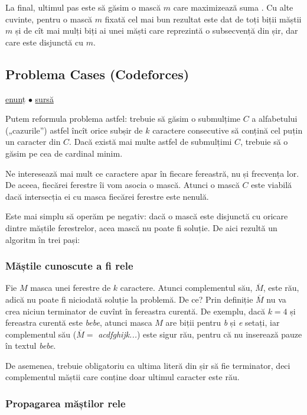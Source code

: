 \documentclass[../main.tex]{subfiles}
\begin{document}
La final, ultimul pas este să găsim o mască $m$ care maximizează suma . Cu alte cuvinte, pentru o mască $m$ fixată cel mai bun rezultat este dat de toți biții măștii $m$ și de cît mai mulți biți ai unei măști care reprezintă o subsecvență din șir, dar care este disjunctă cu $m$.


\subsection{Problema Cases (Codeforces)}
\label{problem:cases}

\href{https://codeforces.com/contest/1995/problem/D}{enunț}
$\bullet$
\hyperref[code:cases]{sursă}

Putem reformula problema astfel: trebuie să găsim o submulțime $C$ a alfabetului („cazurile”) astfel încît orice subșir de $k$ caractere consecutive să conțină cel puțin un caracter din $C$. Dacă există mai multe astfel de submulțimi $C$, trebuie să o găsim pe cea de cardinal minim.

Ne interesează mai mult ce caractere apar în fiecare fereastră, nu și frecvența lor. De aceea, fiecărei ferestre îi vom asocia o mască. Atunci o mască $C$ este viabilă dacă intersecția ei cu masca fiecărei ferestre este nenulă.

Este mai simplu să operăm pe negativ: dacă o mască este disjunctă cu oricare dintre măștile ferestrelor, acea mască nu poate fi soluție. De aici  rezultă un algoritm în trei pași:

\subsubsection*{Măștile cunoscute a fi rele}

Fie $M$ masca unei ferestre de $k$ caractere. Atunci complementul său, $\overline{M}$, este rău, adică nu poate fi niciodată soluție la problemă. De ce? Prin definiție $\overline{M}$ nu va crea niciun terminator de cuvînt în fereastra curentă. De exemplu, dacă $k = 4$ și fereastra curentă este \textit{bebe}, atunci masca $M$ are biții pentru \textit{b} și \textit{e} setați, iar complementul său ($\overline{M} =$ \textit{acdfghijk...}) este sigur rău, pentru că nu inserează pauze în textul \textit{bebe}.

De asemenea, trebuie obligatoriu ca ultima literă din șir să fie terminator, deci complementul măștii care conține doar ultimul caracter este rău.

\subsubsection*{Propagarea măștilor rele}
\end{document}
